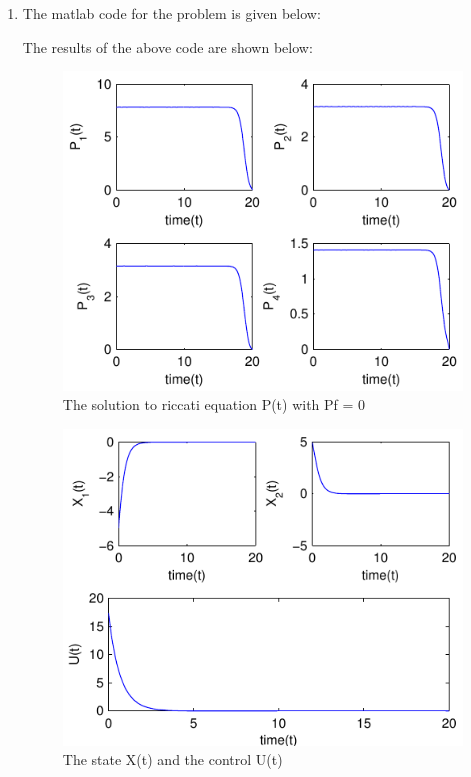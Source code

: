 \begin{enumerate}
 \item The matlab code for the problem is given below:
  
  The results of the above code are shown below:
  \begin{figure}[h!]
   \includegraphics[width=\linewidth]{pic1.pdf}
   \caption{The solution to riccati equation P(t) with Pf = 0}
   \label{fig1}
  \end{figure}
  \begin{figure}[h!]
   \includegraphics[width=\linewidth]{pic2.pdf}
   \caption{The state X(t) and the control U(t)}
  \end{figure}
  \newpage
  

\end{enumerate}
